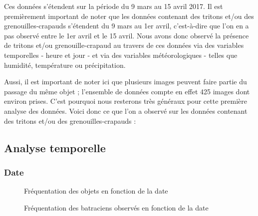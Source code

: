 \noindent Ces données s'étendent sur la période du 9 mars au 15 avril 2017. Il est premièrement important de noter que les données contenant des tritons et/ou des grenouilles-crapauds s'étendent du 9 mars au 1er avril, c'est-à-dire que l'on en a pas observé entre le 1er avril et le 15 avril. Nous avons donc observé la présence de tritons et/ou grenouille-crapaud au travers de ces données via des variables temporelles - heure et jour - et via des variables météorologiques - telles que humidité, température ou précipitation. \newline

Aussi, il est important de noter ici que plusieurs images peuvent faire partie du passage du même objet ; l'ensemble de données compte en effet 425 images dont environ prises. C'est pourquoi nous resterons très généraux pour cette première analyse des données. Voici donc ce que l'on a observé sur les données contenant des tritons et/ou des grenouilles-crapauds :

\subsection{Analyse temporelle}

\subsubsection{Date}

\begin{figure}[!htb]
    \centering
    \caption{Fréquentation des objets en fonction de la date}
    \label{fig:Fréquentation des objets en fonction de la date}
\end{figure}

\begin{figure}[!htb]
    \centering
    \caption{Fréquentation des batraciens observés en fonction de la date}
    \label{fig:Fréquentation des crapauducs en fonction de la date}
\end{figure}

